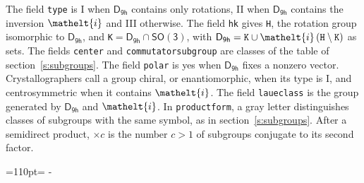 \documentclass[10pt,a4paper]{article}
\makeatletter
\def\grouprule#1#2{\noalign{\marks\LTgroupmarks{\the\belowrulesep}\nobreak\vskip#1%
  \vskip\aboverulesep}\multispan\LT@cols\unskip{\leaders\hrule\@height#2\hfill\kern\z@}\cr
  \noalign{\penalty\LTrulebreak\vskip\belowrulesep\global\@lastruleclass\z@}}
\newcommand{\needspace}[1]{\par\penalty-100\begingroup\dimen0=#1\relax\dimen2=\pagegoal
  \advance\dimen2-\pagetotal\ifdim\dimen0>\dimen2\relax\ifdim\dimen2>0pt\vfil\break\fi\fi
  \endgroup}
\numberwithin{equation}{section}
\newcommand{\eltfont}[1]{{\let\sigma\eltsigma\mathelt{#1}}}
\newcommand{\grp}[1]{\mathsf{#1}}
\newcommand{\elt}[1]{\eltfont{#1}}
\newcommand{\hmname}[1]{#1}
\newcommand{\orbname}[1]{#1}
\newcommand{\conwayname}[1]{#1}
\newcommand{\igname}[1]{#1}
\newcommand{\olivename}[1]{#1}
\newcommand{\dirprod}{\times}
\newcommand{\sdprod}{\rtimes}
\newcommand{\nconj}[1]{{\scriptsize$\times#1$}}
\newcommand{\clsletter}[1]{\,{\scriptsize\color{black!55}#1}}
\makeatother
\begin{document}
{}
\leavevmode\label{n:element.inversion}The field \texttt{type} is I when $\grp{D_{9h}}$ contains only rotations, II when $\grp{D_{9h}}$ contains the inversion $\elt{i}$ and III otherwise. The field \texttt{hk} gives \texttt{H}, the rotation group isomorphic to $\grp{D_{9h}}$, and \texttt{K}${} = \grp{D_{9h}} \cap \grp{SO(3)}$, with $\grp{D_{9h}} = \texttt{K} \cup \elt{i}\,(\texttt{H} \setminus \texttt{K})$ as sets. The fields \texttt{center} and \texttt{commutatorsubgroup} are classes of the table of section~\ref{s:subgroups}. The field \texttt{polar} is yes when $\grp{D_{9h}}$ fixes a nonzero vector. Crystallographers call a group chiral, or enantiomorphic, when its type is I, and centrosymmetric when it contains $\elt{i}$. The field \texttt{laueclass} is the group generated by $\grp{D_{9h}}$ and $\elt{i}$.
In \texttt{productform}, a gray letter distinguishes classes of subgroups with the same symbol, as in section~\ref{s:subgroups}. \label{n:index.conjugates.c}After a semidirect product, ${\times}c$ is the number $c > 1$ of subgroups conjugate to its second factor.
\needspace{110pt}
\end{document}
